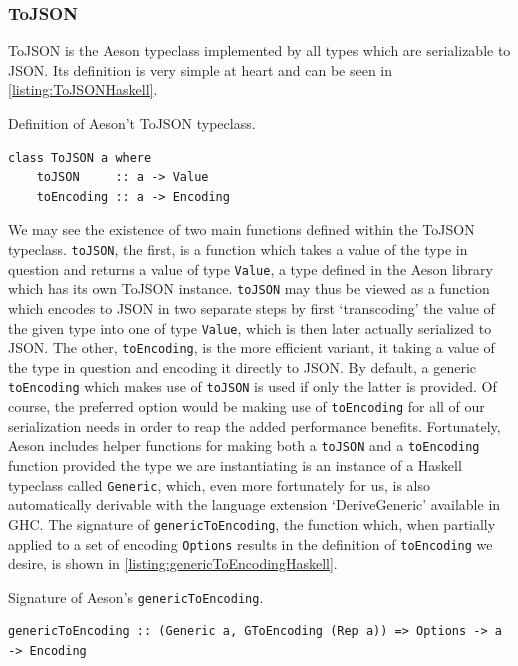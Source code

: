 \documentclass[11pt]{report}
\begin{document}
\subsubsection{ToJSON}

ToJSON is the Aeson typeclass implemented by all types which are serializable
to JSON. Its definition is very simple at heart and can be seen in
\autoref{listing:ToJSONHaskell}.

\begin{listing}[H]
\caption{Definition of Aeson't ToJSON typeclass.}
\label{listing:ToJSONHaskell}
\begin{verbatim}
class ToJSON a where
    toJSON     :: a -> Value
    toEncoding :: a -> Encoding
\end{verbatim}
\end{listing}

We may see the existence of two main functions defined within the ToJSON
typeclass. \texttt{toJSON}, the first, is a function which takes a value
of the type in question and returns a value of type \texttt{Value}, a type
defined in the Aeson library which has its own ToJSON instance.
\texttt{toJSON} may thus be viewed as a function which encodes to JSON in two
separate steps by first `transcoding' the value of the given type into one of
type \texttt{Value}, which is then later actually serialized to JSON\@.
The other, \texttt{toEncoding}, is the more efficient variant, it taking a
value of the type in question and encoding it directly to JSON\@. By default, a
generic \texttt{toEncoding} which makes use of \texttt{toJSON} is used if only
the latter is provided.  Of course, the preferred option would be making use
of \texttt{toEncoding} for all of our serialization needs in order to reap
the added performance benefits. \newline
Fortunately, Aeson includes helper functions for making both a \texttt{toJSON}
and a \texttt{toEncoding} function provided the type we are instantiating is an
instance of a Haskell typeclass called \texttt{Generic}, which, even more
fortunately for us, is also automatically derivable with the language
extension `DeriveGeneric' available in GHC\@. The signature of
\texttt{genericToEncoding}, the function which, when partially applied to a set
of encoding \texttt{Options} results in the definition of \texttt{toEncoding}
we desire, is shown in \autoref{listing:genericToEncodingHaskell}.

\begin{listing}[H]
\caption{Signature of Aeson's \texttt{genericToEncoding}.}
\label{listing:genericToEncodingHaskell}
\begin{verbatim}
genericToEncoding :: (Generic a, GToEncoding (Rep a)) => Options -> a -> Encoding
\end{verbatim}
\end{listing}
\end{document}
